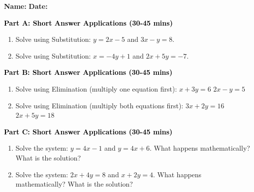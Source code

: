 \documentclass[12pt, letterpaper, fleqn]{article}
\begin{document}
\textbf{Name:} \underline{\hspace{5cm}}
\hfill
\textbf{Date:} \underline{\hspace{3cm}}\\


\begin{tcolorbox}[colback=customteal!20]
\large\textcolor{black}{\textbf{Part A: Short Answer Applications (30-45 mins)}}
\end{tcolorbox}

\vspace{3mm}

\begin{enumerate}[itemsep=4.2cm, leftmargin=0.6cm]
\item Solve using Substitution: $y = 2x - 5$ and $3x - y = 8$.
\item Solve using Substitution: $x = -4y + 1$ and $2x + 5y = -7$.
\end{enumerate}

\newpage

\begin{tcolorbox}[colback=customteal!20]
\large\textcolor{black}{\textbf{Part B: Short Answer Applications (30-45 mins)}}
\end{tcolorbox}

\vspace{3mm}

\begin{enumerate}[itemsep=4.2cm, leftmargin=0.6cm, resume]
\item Solve using Elimination (multiply one equation first): 
$x + 3y = 6$
$2x - y = 5$
\item Solve using Elimination (multiply both equations first):
$3x + 2y = 16$
$2x + 5y = 18$
\end{enumerate}

\newpage

\begin{tcolorbox}[colback=customteal!20]
\large\textcolor{black}{\textbf{Part C: Short Answer Applications (30-45 mins)}}
\end{tcolorbox}

\vspace{3mm}

\begin{enumerate}[itemsep=4.2cm, leftmargin=0.6cm, resume]
\item Solve the system: $y = 4x - 1$ and $y = 4x + 6$. What happens mathematically? What is the solution?
\item Solve the system: $2x + 4y = 8$ and $x + 2y = 4$. What happens mathematically? What is the solution?
\end{enumerate}
\end{document}
